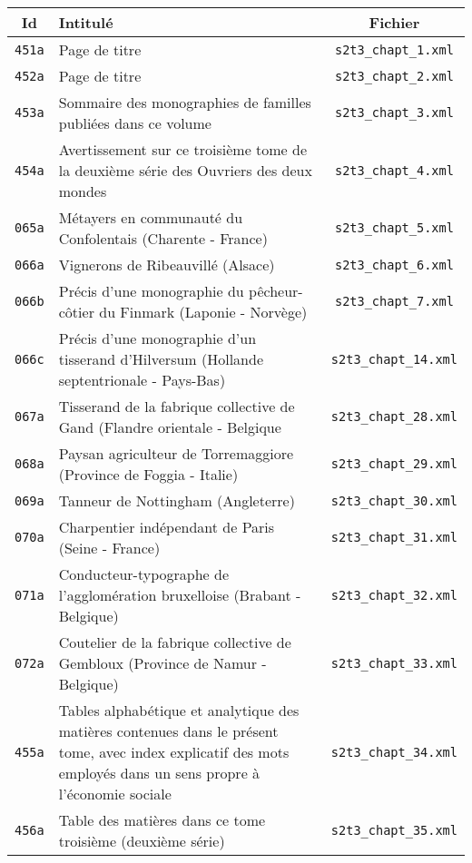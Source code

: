 \begin{center}
\begin{longtable}{ | c | p{9.5cm} | c | }
\hline
Id & Intitulé & Fichier \\ \hline
\texttt{451a} & Page de titre & \texttt{s2t3\_chapt\_1.xml} \\ \hline
\texttt{452a} & Page de titre & \texttt{s2t3\_chapt\_2.xml} \\ \hline
\texttt{453a} & Sommaire des monographies de familles publiées dans ce volume & \texttt{s2t3\_chapt\_3.xml} \\ \hline
\texttt{454a} & Avertissement sur ce troisième tome de la deuxième série des Ouvriers des deux mondes & \texttt{s2t3\_chapt\_4.xml} \\ \hline
\texttt{065a} & Métayers en communauté du Confolentais (Charente - France) & \texttt{s2t3\_chapt\_5.xml} \\ \hline
\texttt{066a} & Vignerons de Ribeauvillé (Alsace) & \texttt{s2t3\_chapt\_6.xml} \\ \hline
\texttt{066b} & Précis d'une monographie du pêcheur-côtier du Finmark (Laponie - Norvège) & \texttt{s2t3\_chapt\_7.xml} \\ \hline
\texttt{066c} & Précis d'une monographie d'un tisserand d'Hilversum (Hollande septentrionale - Pays-Bas) & \texttt{s2t3\_chapt\_14.xml} \\ \hline
\texttt{067a} & Tisserand de la fabrique collective de Gand (Flandre orientale - Belgique & \texttt{s2t3\_chapt\_28.xml} \\ \hline
\texttt{068a} & Paysan agriculteur de Torremaggiore (Province de Foggia - Italie) & \texttt{s2t3\_chapt\_29.xml} \\ \hline
\texttt{069a} & Tanneur de Nottingham (Angleterre) & \texttt{s2t3\_chapt\_30.xml} \\ \hline
\texttt{070a} & Charpentier indépendant de Paris (Seine - France) & \texttt{s2t3\_chapt\_31.xml} \\ \hline
\texttt{071a} & Conducteur-typographe de l'agglomération bruxelloise (Brabant - Belgique) & \texttt{s2t3\_chapt\_32.xml} \\ \hline
\texttt{072a} & Coutelier de la fabrique collective de Gembloux (Province de Namur - Belgique) & \texttt{s2t3\_chapt\_33.xml} \\ \hline
\texttt{455a} & Tables alphabétique et analytique des matières contenues dans le présent tome, avec index explicatif des mots employés dans un sens propre à l'économie sociale & \texttt{s2t3\_chapt\_34.xml} \\ \hline
\texttt{456a} & Table des matières dans ce tome troisième (deuxième série) & \texttt{s2t3\_chapt\_35.xml} \\ \hline
\end{longtable}
\end{center}


